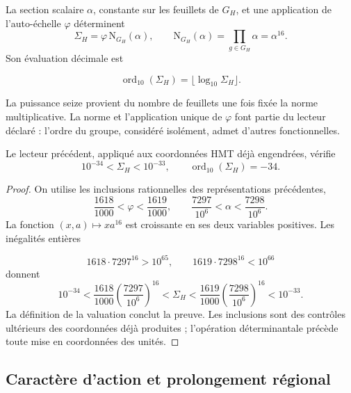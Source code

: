\begin{definition}
\label{iv:action:norma}
La section scalaire \(\alpha\), constante sur les feuillets de \(G_H\),
et une application de l’auto-échelle \(\varphi\) déterminent
\begin{equation}
 \Sigma_H=\varphi\,\mathrm N_{G_H}(\alpha),\qquad
 \mathrm N_{G_H}(\alpha)=\prod_{g\in G_H}\alpha=\alpha^{16}.
 \label{iv:action:sigma}
\end{equation}
Son évaluation décimale est

\[
 \operatorname{ord}_{10}(\Sigma_H)
   =\lfloor\log_{10}\Sigma_H\rfloor.
\]
\end{definition}
La puissance seize provient du nombre de feuillets une fois fixée
la norme multiplicative. La norme et l’application unique de
\(\varphi\) font partie du lecteur déclaré : l’ordre du groupe,
considéré isolément, admet d’autres fonctionnelles.


\begin{theorem}
\label{iv:action:decada}
Le lecteur précédent, appliqué aux coordonnées HMT déjà engendrées,
vérifie
\begin{equation}
 10^{-34}<\Sigma_H<10^{-33},
 \qquad \operatorname{ord}_{10}(\Sigma_H)=-34.
 \label{iv:action:orden-decimal}
\end{equation}
\end{theorem}
\begin{proof}
On utilise les inclusions rationnelles des représentations
précédentes,
\begin{equation}
 \frac{1618}{1000}<\varphi<\frac{1619}{1000},
 \qquad
 \frac{7297}{10^6}<\alpha<\frac{7298}{10^6}.
 \label{iv:action:intervalos}
\end{equation}
La fonction \((x,a)\mapsto xa^{16}\) est croissante en ses deux
variables positives. Les inégalités entières

\[
 1618\cdot7297^{16}>10^{65},
 \qquad 1619\cdot7298^{16}<10^{66}
\]
donnent
\[
 10^{-34}
 <\frac{1618}{1000}\left(\frac{7297}{10^6}\right)^{16}
 <\Sigma_H
 <\frac{1619}{1000}\left(\frac{7298}{10^6}\right)^{16}
 <10^{-33}.
\]
La définition de la valuation conclut la preuve. Les inclusions
sont des contrôles ultérieurs des coordonnées déjà produites ;
l’opération déterminantale précède toute mise en coordonnées des unités.
\end{proof}

\subsection{Caractère d’action et prolongement régional
}
\label{iv:action:caracter}

